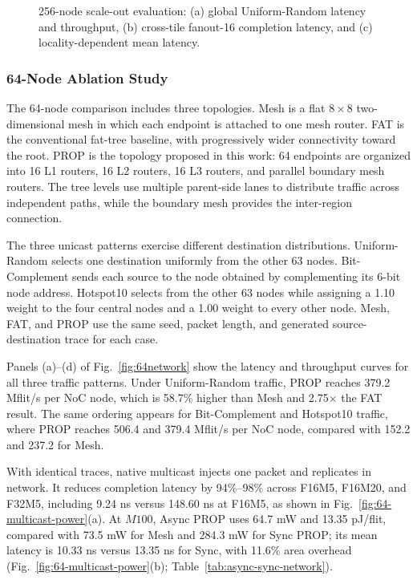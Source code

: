 \documentclass[conference]{IEEEtran}
\begin{document}
\begin{figure}[!t]
\centering

\caption{256-node scale-out evaluation: (a) global Uniform-Random latency and throughput, (b) cross-tile fanout-16 completion latency, and (c) locality-dependent mean latency.}
\label{fig:256network}
\end{figure}

\subsubsection{64-Node Ablation Study}

The 64-node comparison includes three topologies. Mesh is a flat
\(8\times8\) two-dimensional mesh in which each endpoint is attached to one
mesh router. FAT is the conventional fat-tree baseline, with progressively
wider connectivity toward the root. PROP is the topology
proposed in this work: 64 endpoints are organized into 16 L1 routers, 16 L2
routers, 16 L3 routers, and parallel boundary mesh routers. The tree levels
use multiple parent-side lanes to distribute traffic across independent
paths, while the boundary mesh provides the inter-region connection.

The three unicast patterns exercise different destination distributions.
Uniform-Random selects one destination uniformly from the other 63 nodes.
Bit-Complement sends each source to the node obtained by complementing its
6-bit node address. Hotspot10 selects from the other 63 nodes while assigning
a 1.10 weight to the four central nodes and a 1.00 weight to every other
node. Mesh, FAT, and PROP use the same seed, packet length, and generated
source-destination trace for each case.

Panels (a)--(d) of Fig.~\ref{fig:64network} show the latency and throughput
curves for all three traffic patterns. Under Uniform-Random traffic, PROP
reaches 379.2 Mflit/s per NoC node, which is 58.7\% higher than Mesh and
2.75$\times$ the FAT result. The same ordering appears for Bit-Complement
and Hotspot10 traffic, where PROP reaches 506.4 and 379.4 Mflit/s per NoC
node, compared with 152.2 and 237.2 for Mesh.

With identical traces, native multicast injects one packet and replicates in
network. It reduces completion latency by 94\%--98\% across F16M5, F16M20,
and F32M5, including 9.24 ns versus 148.60 ns at F16M5, as shown in
Fig.~\ref{fig:64-multicast-power}(a). At \(M100\), Async PROP uses 64.7 mW
and 13.35 pJ/flit, compared with 73.5 mW for Mesh and 284.3 mW for Sync
PROP; its mean latency is 10.33 ns versus 13.35 ns for Sync, with 11.6\%
area overhead (Fig.~\ref{fig:64-multicast-power}(b); Table~\ref{tab:async-sync-network}).
\end{document}
